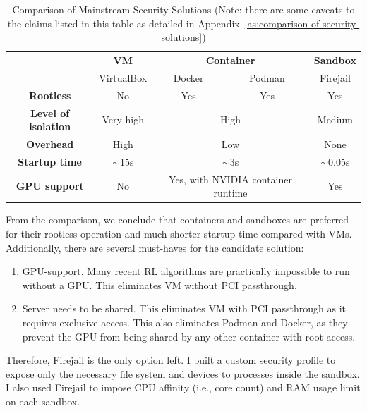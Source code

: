 \begin{table}[H]
\centering
\begin{tabular}{|c|c|cc|c|}
\hline
\multirow{2}{*}{} & \textbf{VM} & \multicolumn{2}{c|}{\textbf{Container}} & \textbf{Sandbox} \\ \cline{2-5} 
 & VirtualBox & \multicolumn{1}{c|}{Docker} & Podman & Firejail \\ \hline
\textbf{Rootless} & No & \multicolumn{1}{c|}{Yes} & Yes & Yes \\ \hline
\textbf{Level of isolation} & Very high & \multicolumn{2}{c|}{High} & Medium \\ \hline
\textbf{Overhead} & High & \multicolumn{2}{c|}{Low} & None \\ \hline
\textbf{Startup time} & $\sim$15s & \multicolumn{2}{c|}{$\sim$3s} & $\sim$0.05s \\ \hline
\textbf{GPU support} & No & \multicolumn{2}{c|}{Yes, with NVIDIA container runtime} & Yes \\ \hline
\end{tabular}
\caption[Comparison of Mainstream Security Solutions]{Comparison of Mainstream Security Solutions (Note: there are some caveats to the claims listed in this table as detailed in Appendix~\ref{as:comparison-of-security-solutions})}
\label{tab:security-solutions}
\end{table}

From the comparison, we conclude that containers and sandboxes are preferred for their rootless operation and much shorter startup time compared with VMs. Additionally, there are several must-haves for the candidate solution:

\begin{enumerate}
    \item GPU-support. Many recent RL algorithms are practically impossible to run without a GPU. This eliminates VM without PCI passthrough.
    \item Server needs to be shared. This eliminates VM with PCI passthrough as it requires exclusive access. This also eliminates Podman and Docker, as they prevent the GPU from being shared by any other container with root access.
\end{enumerate}

Therefore, Firejail is the only option left. I built a custom security profile to expose only the necessary file system and devices to processes inside the sandbox. I also used Firejail to impose CPU affinity (i.e., core count) and RAM usage limit on each sandbox.

